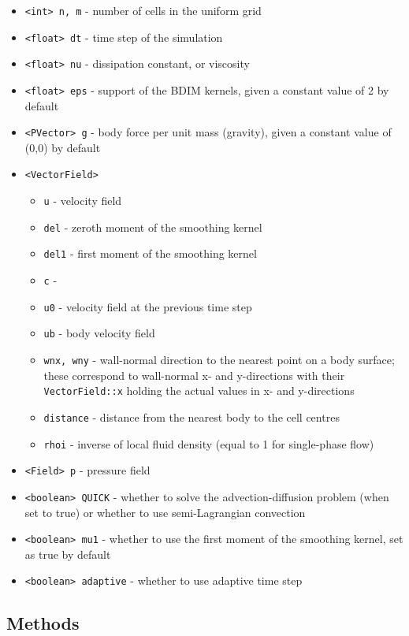 \documentclass[notitlepage]{article}
\begin{document}
\begin{itemize}
\item \texttt{<int> n, m} - number of cells in the uniform grid
\item \texttt{<float> dt} - time step of the simulation
\item \texttt{<float> nu} - dissipation constant, or viscosity
\item \texttt{<float> eps} - support of the BDIM kernels, given a constant value of 2 by default
\item \texttt{<PVector> g} - body force per unit mass (gravity), given a constant value of (0,0) by default
\item \texttt{<VectorField>}
	\begin{itemize}
	\item \texttt{u} - velocity field
	\item \texttt{del} - zeroth moment of the smoothing kernel
	\item \texttt{del1} - first moment of the smoothing kernel
	\item \texttt{c} - 
	\item \texttt{u0} - velocity field at the previous time step
	\item \texttt{ub} - body velocity field
	\item \texttt{wnx, wny} - wall-normal direction to the nearest point on a body surface; these correspond
		to wall-normal x- and y-directions with their \texttt{VectorField::x} holding the actual values in x- and y-directions
	\item \texttt{distance} - distance from the nearest body to the cell centres
	\item \texttt{rhoi} - inverse of local fluid density (equal to 1 for single-phase flow)
	\end{itemize}
\item \texttt{<Field> p} - pressure field
\item \texttt{<boolean> QUICK} - whether to solve the advection-diffusion problem (when set to true) or whether
	to use semi-Lagrangian convection
\item \texttt{<boolean> mu1} - whether to use the first moment of the smoothing kernel, set as true by default
\item \texttt{<boolean> adaptive} - whether to use adaptive time step
\end{itemize}

\subsection{Methods}
\end{document}
